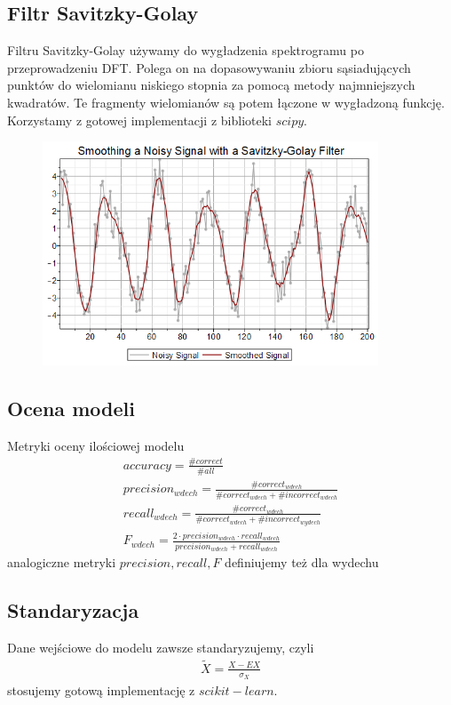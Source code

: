 \documentclass[polish]{article}
\begin{document}
\subsection{Filtr Savitzky-Golay}
Filtru Savitzky-Golay używamy do wygładzenia spektrogramu po przeprowadzeniu DFT.  Polega on na dopasowywaniu zbioru sąsiadujących punktów do wielomianu niskiego stopnia za pomocą metody najmniejszych kwadratów.
Te fragmenty wielomianów są potem łączone w wygładzoną funkcję. Korzystamy z gotowej implementacji
z biblioteki $scipy$.
\begin{figure}[H]
	\centering
	\includegraphics[width=10cm]{savitzky_golay_filter}
\end{figure}

\subsection{Ocena modeli}
Metryki oceny ilościowej modelu
\begin{gather*}
	accuracy = \frac{\# correct}{\# all} \\
	precision_{wdech} = \frac{\# correct_{wdech}}{\# correct_{wdech} + \# incorrect_{wdech}} \\
	recall_{wdech} = \frac{\# correct_{wdech}}{\# correct_{wdech} + \# incorrect_{wydech}} \\
	F_{wdech} = \frac{2 \cdot precision_{wdech} \cdot recall_{wdech}}{precision_{wdech} + recall_{wdech}}
\end{gather*}
analogiczne metryki $precision, recall, F$ definiujemy też dla wydechu
\subsection{Standaryzacja}
Dane wejściowe do modelu zawsze standaryzujemy, czyli
\begin{gather*}
	\tilde X = \frac{X - EX}{\sigma_X}
\end{gather*}
stosujemy gotową implementację z $scikit-learn$.
\end{document}
